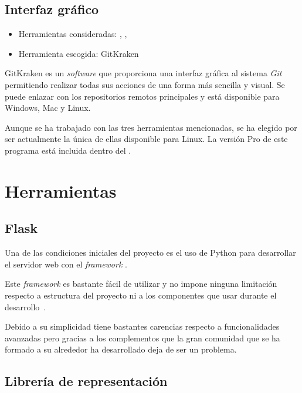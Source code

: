 \subsection{Interfaz gráfico}

\begin{itemize}
	\tightlist
	\item Herramientas consideradas:
	,
	,
	\item Herramienta escogida: GitKraken
\end{itemize}

GitKraken es un \textit{software} que proporciona una interfaz gráfica al
sistema \textit{Git} permitiendo realizar todas sus acciones de una forma más
sencilla y visual. Se puede enlazar con los repositorios remotos principales y
está disponible para Windows, Mac y Linux.

Aunque se ha trabajado con las tres herramientas mencionadas, se ha elegido por
ser actualmente la única de ellas disponible para Linux. La versión Pro de este
programa está incluida dentro del
.

\section{Herramientas}

\subsection{Flask}

Una de las condiciones iniciales del proyecto es el uso de Python para
desarrollar el servidor web con el \textit{framework}
.

Este \textit{framework} es bastante fácil de utilizar y no impone ninguna
limitación respecto a estructura del proyecto ni a los componentes que usar
durante el desarrollo~\cite{grinberg2014flask}.

Debido a su simplicidad tiene bastantes carencias respecto a funcionalidades
avanzadas pero gracias a los complementos que la gran comunidad que se ha
formado a su alrededor ha desarrollado deja de ser un problema.

\subsection{Librería de representación}


